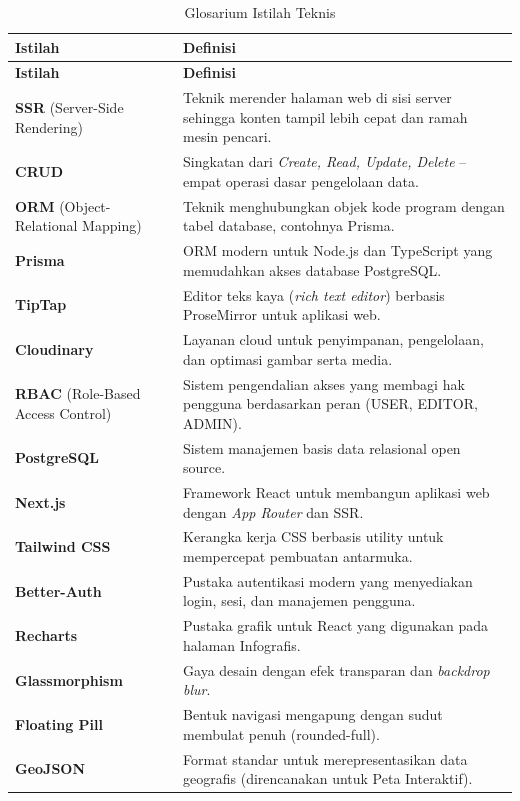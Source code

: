 \documentclass[12pt,a4paper]{report}
\begin{document}
\renewcommand{\arraystretch}{1.3}
\begin{longtable}{p{} p{}}
    \caption{Glosarium Istilah Teknis}\\
    \toprule
    \textbf{Istilah} & \textbf{Definisi} \\
    \midrule
    \endfirsthead
    \toprule
    \textbf{Istilah} & \textbf{Definisi} \\
    \midrule
    \endhead
    \bottomrule
    \endfoot
    \textbf{SSR} (Server-Side Rendering) & Teknik merender halaman web di sisi server sehingga konten tampil lebih cepat dan ramah mesin pencari. \\
    \textbf{CRUD} & Singkatan dari \emph{Create, Read, Update, Delete} -- empat operasi dasar pengelolaan data. \\
    \textbf{ORM} (Object-Relational Mapping) & Teknik menghubungkan objek kode program dengan tabel database, contohnya Prisma. \\
    \textbf{Prisma} & ORM modern untuk Node.js dan TypeScript yang memudahkan akses database PostgreSQL. \\
    \textbf{TipTap} & Editor teks kaya (\emph{rich text editor}) berbasis ProseMirror untuk aplikasi web. \\
    \textbf{Cloudinary} & Layanan cloud untuk penyimpanan, pengelolaan, dan optimasi gambar serta media. \\
    \textbf{RBAC} (Role-Based Access Control) & Sistem pengendalian akses yang membagi hak pengguna berdasarkan peran (USER, EDITOR, ADMIN). \\
    \textbf{PostgreSQL} & Sistem manajemen basis data relasional open source. \\
    \textbf{Next.js} & Framework React untuk membangun aplikasi web dengan \emph{App Router} dan SSR. \\
    \textbf{Tailwind CSS} & Kerangka kerja CSS berbasis utility untuk mempercepat pembuatan antarmuka. \\
    \textbf{Better-Auth} & Pustaka autentikasi modern yang menyediakan login, sesi, dan manajemen pengguna. \\
    \textbf{Recharts} & Pustaka grafik untuk React yang digunakan pada halaman Infografis. \\
    \textbf{Glassmorphism} & Gaya desain dengan efek transparan dan \emph{backdrop blur}. \\
    \textbf{Floating Pill} & Bentuk navigasi mengapung dengan sudut membulat penuh (rounded-full). \\
    \textbf{GeoJSON} & Format standar untuk merepresentasikan data geografis (direncanakan untuk Peta Interaktif). \\
    \end{longtable}
\end{document}
